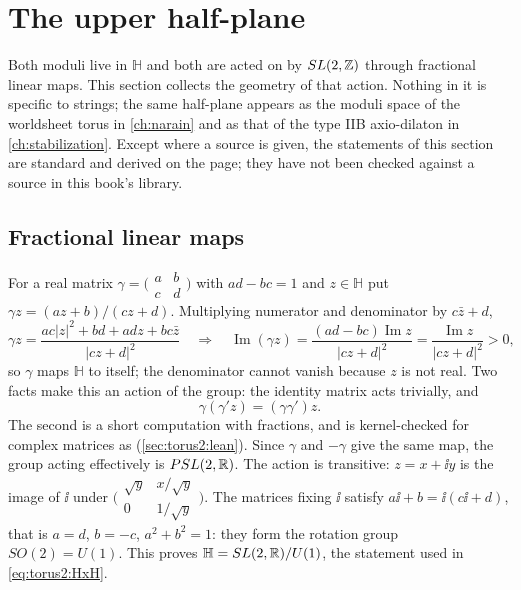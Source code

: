 \section{The upper half-plane}\label{sec:torus2:halfplane}

Both moduli live in $\mathbb H$ and both are acted on by $SL(2,\mathbb{Z})$ through fractional linear
maps. This section collects the geometry of that action. Nothing in it is specific to
strings; the same half-plane appears as the moduli space of the worldsheet torus in
\cref{ch:narain} and as that of the type IIB axio-dilaton in \cref{ch:stabilization}. Except where a source is
given, the statements of this section are standard and derived on the page; they have not
been checked against a source in this book's library.

\subsection{Fractional linear maps}

For a real matrix $\gamma=\big(\begin{smallmatrix}a&b\\c&d\end{smallmatrix}\big)$ with
$ad-bc=1$ and $z\in\mathbb H$ put $\gamma z=(az+b)/(cz+d)$. Multiplying numerator and
denominator by $c\bar z+d$,
\begin{equation}\label{eq:torus2:Im}
 \gamma z=\frac{ac|z|^2+bd+adz+bc\bar z}{|cz+d|^2}
 \quad\Longrightarrow\quad
 \operatorname{Im}(\gamma z)=\frac{(ad-bc)\operatorname{Im}z}{|cz+d|^2}
 =\frac{\operatorname{Im}z}{|cz+d|^2}>0 ,
\end{equation}
so $\gamma$ maps $\mathbb H$ to itself; the denominator cannot vanish because $z$ is not
real. Two facts make this an action of the group: the identity matrix acts trivially, and
\begin{equation}\label{eq:torus2:compose}
 \gamma(\gamma'z)=(\gamma\gamma')z .
\end{equation}
The second is a short computation with fractions, and is kernel-checked for complex
matrices as  \TA{} (\cref{sec:torus2:lean}). Since $\gamma$ and $-\gamma$
give the same map, the group acting effectively is $PSL(2,\mathbb{R})$. The action is transitive:
$z=x+\ii y$ is the image of $\ii$ under
$\big(\begin{smallmatrix}\sqrt y&x/\sqrt y\\0&1/\sqrt y\end{smallmatrix}\big)$. The matrices
fixing $\ii$ satisfy $a\ii+b=\ii(c\ii+d)$, that is $a=d$, $b=-c$, $a^2+b^2=1$: they form the
rotation group $SO(2)=U(1)$. This proves $\mathbb H=SL(2,\mathbb{R})/U(1)$, the statement used in
\eqref{eq:torus2:HxH}.

